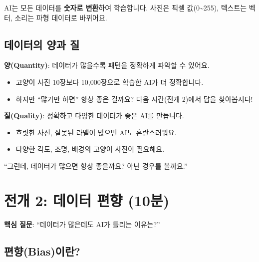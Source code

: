 \documentclass[11pt,a4paper]{article}
\begin{document}
\begin{tipbox}
AI는 모든 데이터를 \textbf{숫자로 변환}하여 학습합니다. 사진은 픽셀 값(0\textasciitilde255), 텍스트는 벡터, 소리는 파형 데이터로 바뀌어요.
\end{tipbox}

\subsection{데이터의 양과 질}

\textbf{양(Quantity)}: 데이터가 많을수록 패턴을 정확하게 파악할 수 있어요.
\begin{itemize}[nosep]
    \item 고양이 사진 10장보다 10,000장으로 학습한 AI가 더 정확합니다.
    \item 하지만 ``많기만 하면'' 항상 좋은 걸까요? \textrightarrow{} 다음 시간(전개 2)에서 답을 찾아봅시다!
\end{itemize}

\textbf{질(Quality)}: 정확하고 다양한 데이터가 좋은 AI를 만듭니다.
\begin{itemize}[nosep]
    \item 흐릿한 사진, 잘못된 라벨이 많으면 AI도 혼란스러워요.
    \item 다양한 각도, 조명, 배경의 고양이 사진이 필요해요.
\end{itemize}

\begin{scriptbox}
``그런데, 데이터가 많으면 항상 좋을까요? 아닌 경우를 볼까요.''
\end{scriptbox}

\newpage

\section{ 전개 2: 데이터 편향 (10분)}

\begin{questionbox}
 \textbf{핵심 질문}: ``데이터가 많은데도 AI가 틀리는 이유는?''
\end{questionbox}

\subsection{편향(Bias)이란?}
\end{document}
